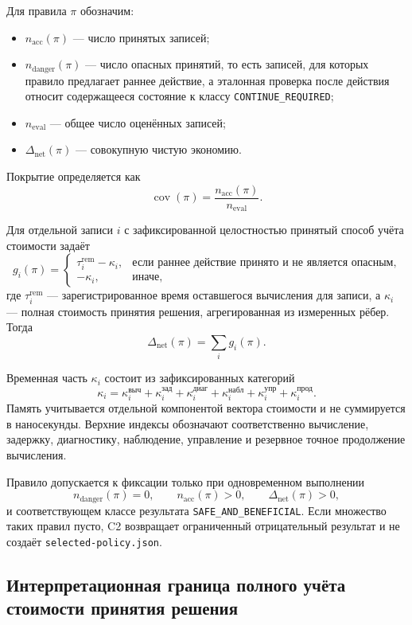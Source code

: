 Для правила \(\pi\) обозначим:

\begin{itemize}
  \item \(n_{\mathrm{acc}}(\pi)\) --- число принятых записей;
  \item \(n_{\mathrm{danger}}(\pi)\) --- число опасных принятий, то есть
  записей, для которых правило предлагает раннее действие, а эталонная проверка
  после действия относит содержащееся состояние к классу
  \texttt{CONTINUE\_REQUIRED};
  \item \(n_{\mathrm{eval}}\) --- общее число оценённых записей;
  \item \(\Delta_{\mathrm{net}}(\pi)\) --- совокупную чистую экономию.
\end{itemize}

Покрытие определяется как
\[
  \operatorname{cov}(\pi)
  =\frac{n_{\mathrm{acc}}(\pi)}{n_{\mathrm{eval}}}.
\]

Для отдельной записи \(i\) с зафиксированной целостностью принятый способ
учёта стоимости задаёт
\[
  g_i(\pi)=
  \begin{cases}
    \tau_i^{\mathrm{rem}}-\kappa_i,
      & \text{если раннее действие принято и не является опасным},\\
    -\kappa_i, & \text{иначе},
  \end{cases}
\]
где \(\tau_i^{\mathrm{rem}}\) --- зарегистрированное время оставшегося
вычисления для записи, а \(\kappa_i\) --- полная стоимость принятия решения,
агрегированная из измеренных рёбер. Тогда
\[
  \Delta_{\mathrm{net}}(\pi)=\sum_i g_i(\pi).
\]

Временная часть \(\kappa_i\) состоит из зафиксированных категорий
\[
  \kappa_i = \kappa_i^{\text{выч}} + \kappa_i^{\text{зад}} +
        \kappa_i^{\text{диаг}} + \kappa_i^{\text{набл}} +
        \kappa_i^{\text{упр}} + \kappa_i^{\text{прод}}.
\]
Память учитывается отдельной компонентой вектора стоимости и не суммируется в
наносекунды. Верхние индексы обозначают соответственно вычисление, задержку,
диагностику, наблюдение, управление и резервное точное продолжение вычисления.

Правило допускается к фиксации только при одновременном выполнении
\[
  n_{\mathrm{danger}}(\pi)=0, \qquad
  n_{\mathrm{acc}}(\pi)>0, \qquad
  \Delta_{\mathrm{net}}(\pi)>0,
\]
и соответствующем классе результата \texttt{SAFE\_AND\_BENEFICIAL}. Если
множество таких правил пусто, C2 возвращает ограниченный отрицательный результат
и не создаёт \texttt{selected-policy.json}.

\subsection{Интерпретационная граница полного учёта стоимости принятия решения}

